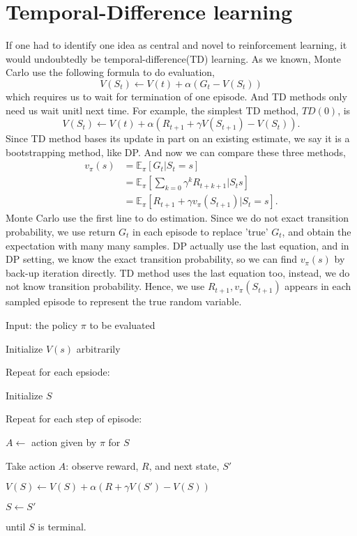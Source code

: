 \documentclass[11pt,a4paper]{article}
\def\E{\mathbb{E}}
\begin{document}
\section{Temporal-Difference learning}
If one had to identify one idea as central and novel to reinforcement learning, it would undoubtedly be temporal-difference(TD) learning. As we known, Monte Carlo use the following formula to do evaluation,
\begin{equation}
V(S_t) \leftarrow V(t) + \alpha (G_t - V(S_t))
\end{equation}
which requires us to wait for termination of one episode. And TD methods only need us wait unitl next time. For example, the simplest TD method, $TD(0)$, is 
\begin{equation}
V(S_t) \leftarrow V(t) + \alpha(R_{t+1} + \gamma V(S_{t+1}) - V(S_t)).
\end{equation}
Since TD method bases its update in part on an existing estimate, we say it is a bootstrapping method, like DP. And now we can compare these three methods,
\begin{align}
v_{\pi}(s) & = \E_{\pi}[G_t | S_t = s] \\ 
& = \E_{\pi}[\sum_{k=0}\gamma^k R_{t+k+1} | S_ts] \\ 
& = \E_{\pi}[R_{t+1} + \gamma v_{\pi}(S_{t+1})|S_t = s].
\end{align}
Monte Carlo use the first line to do estimation. Since we do not exact transition probability, we use return $G_t$ in each episode to replace 'true' $G_t$, and obtain the expectation with many many samples. DP actually use the last equation, and in DP setting, we know the exact transition probability, so we can find $v_{\pi}(s)$ by back-up iteration directly. TD method uses the last equation too, instead, we do not know transition probability. Hence, we use $R_{t+1}, v_{\pi}(S_{t+1})$ appears in each sampled episode to represent the true random variable.
\begin{tcolorbox}
Input: the policy $\pi$ to be evaluated \par 
Initialize $V(s)$ arbitrarily\par 
Repeat for each epsiode: \par 
\hspace{1cm} Initialize $S$ \par
\hspace{1cm} Repeat for each step of episode: \par 
\hspace{2cm} $A \leftarrow$ action given by $\pi$ for $S$ \par 
\hspace{2cm} Take action $A$: observe reward, $R$, and next state, $S'$ \par 
\hspace{2cm} $V(S) \leftarrow V(S) + \alpha(R + \gamma V(S') - V(S))$ \par 
\hspace{2cm} $S \leftarrow S'$\par 
\hspace{1cm} until $S$ is terminal.
\end{tcolorbox}
\end{document}
